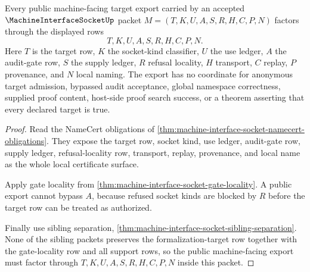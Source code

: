 \begin{theorem}
\label{thm:machine-interface-socket-public-target-export}
Every public machine-facing target export carried by an accepted $\MachineInterfaceSocketUp$ packet $M=(T,K,U,A,S,R,H,C,P,N)$ factors through the displayed rows
$$
T,K,U,A,S,R,H,C,P,N .
$$
Here $T$ is the target row, $K$ the socket-kind classifier, $U$ the use ledger, $A$ the audit-gate row, $S$ the supply ledger, $R$ refusal locality, $H$ transport, $C$ replay, $P$ provenance, and $N$ local naming. The export has no coordinate for anonymous target admission, bypassed audit acceptance, global namespace correctness, supplied proof content, host-side proof search success, or a theorem asserting that every declared target is true.
\end{theorem}
\begin{proof}
Read the NameCert obligations of \autoref{thm:machine-interface-socket-namecert-obligations}. They expose the target row, socket kind, use ledger, audit-gate row, supply ledger, refusal-locality row, transport, replay, provenance, and local name as the whole local certificate surface.

Apply gate locality from \autoref{thm:machine-interface-socket-gate-locality}. A public export cannot bypass $A$, because refused socket kinds are blocked by $R$ before the target row can be treated as authorized.

Finally use sibling separation, \autoref{thm:machine-interface-socket-sibling-separation}. None of the sibling packets preserves the formalization-target row together with the gate-locality row and all support rows, so the public machine-facing export must factor through $T,K,U,A,S,R,H,C,P,N$ inside this packet.
\end{proof}



